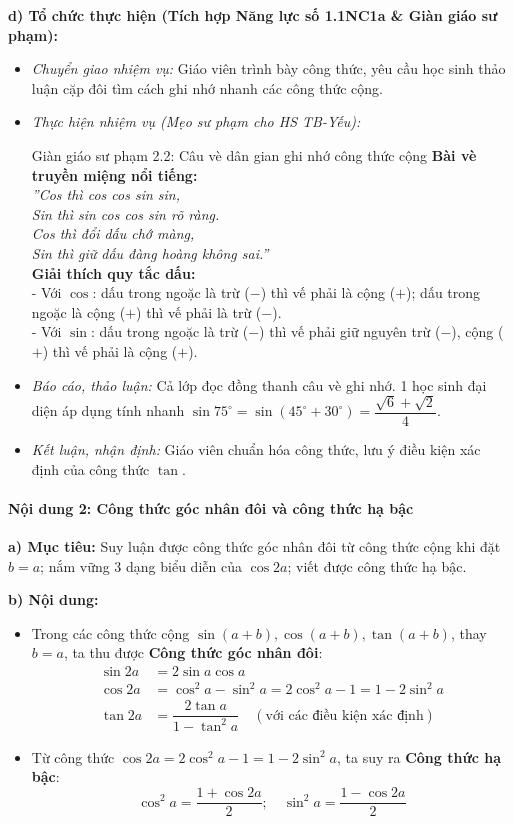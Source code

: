 \documentclass[12pt, a4paper]{article}
\begin{document}
\textbf{d) Tổ chức thực hiện (Tích hợp Năng lực số 1.1NC1a & Giàn giáo sư phạm):}
\begin{itemize}[leftmargin=0.6cm]
    \item \textit{Chuyển giao nhiệm vụ:} Giáo viên trình bày công thức, yêu cầu học sinh thảo luận cặp đôi tìm cách ghi nhớ nhanh các công thức cộng.
    \item \textit{Thực hiện nhiệm vụ (Mẹo sư phạm cho HS TB-Yếu):}
    \begin{scaffoldbox}{Giàn giáo sư phạm 2.2: Câu vè dân gian ghi nhớ công thức cộng}
        \textbf{Bài vè truyền miệng nổi tiếng:}\\
        \textit{''Cos thì cos cos sin sin,}\\
        \textit{Sin thì sin cos cos sin rõ ràng.}\\
        \textit{Cos thì đổi dấu chớ màng,}\\
        \textit{Sin thì giữ dấu đàng hoàng không sai.''}\\
        \textbf{Giải thích quy tắc dấu:}\\
        - Với $\cos$: dấu trong ngoặc là trừ ($-$) thì vế phải là cộng ($+$); dấu trong ngoặc là cộng ($+$) thì vế phải là trừ ($-$).\\
        - Với $\sin$: dấu trong ngoặc là trừ ($-$) thì vế phải giữ nguyên trừ ($-$), cộng ($+$) thì vế phải là cộng ($+$).
    \end{scaffoldbox}
    \item \textit{Báo cáo, thảo luận:} Cả lớp đọc đồng thanh câu vè ghi nhớ. 1 học sinh đại diện áp dụng tính nhanh $\sin 75^\circ = \sin(45^\circ + 30^\circ) = \dfrac{\sqrt{6} + \sqrt{2}}{4}$.
    \item \textit{Kết luận, nhận định:} Giáo viên chuẩn hóa công thức, lưu ý điều kiện xác định của công thức $\tan$.
\end{itemize}

\paragraph{Nội dung 2: Công thức góc nhân đôi và công thức hạ bậc}
\textbf{a) Mục tiêu:} Suy luận được công thức góc nhân đôi từ công thức cộng khi đặt $b = a$; nắm vững 3 dạng biểu diễn của $\cos 2a$; viết được công thức hạ bậc.

\textbf{b) Nội dung:}
\begin{itemize}[leftmargin=0.6cm]
    \item Trong các công thức cộng $\sin(a + b), \cos(a + b), \tan(a + b)$, thay $b = a$, ta thu được \textbf{Công thức góc nhân đôi}:
    \begin{align*}
        \sin 2a &= 2\sin a \cos a \\
        \cos 2a &= \cos^2 a - \sin^2 a = 2\cos^2 a - 1 = 1 - 2\sin^2 a \\
        \tan 2a &= \dfrac{2\tan a}{1 - \tan^2 a} \quad (\text{với các điều kiện xác định})
    \end{align*}
    \item Từ công thức $\cos 2a = 2\cos^2 a - 1 = 1 - 2\sin^2 a$, ta suy ra \textbf{Công thức hạ bậc}:
    $$\cos^2 a = \dfrac{1 + \cos 2a}{2}; \quad \sin^2 a = \dfrac{1 - \cos 2a}{2}$$
\end{itemize}
\end{document}
